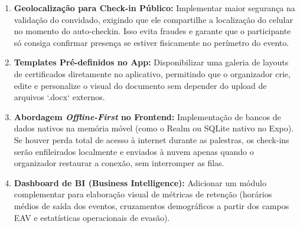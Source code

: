 \begin{enumerate}
    \item \textbf{Geolocalização para Check-in Público:} Implementar maior segurança na validação do convidado, exigindo que ele compartilhe a localização do celular no momento do auto-checkin. Isso evita fraudes e garante que o participante só consiga confirmar presença se estiver fisicamente no perímetro do evento.
    \item \textbf{Templates Pré-definidos no App:} Disponibilizar uma galeria de layouts de certificados diretamente no aplicativo, permitindo que o organizador crie, edite e personalize o visual do documento sem depender do upload de arquivos `.docx` externos.
    \item \textbf{Abordagem \textit{Offline-First} no Frontend:} Implementação de bancos de dados nativos na memória móvel (como o Realm ou SQLite nativo no Expo). Se houver perda total de acesso à internet durante as palestras, os check-ins serão enfileirados localmente e enviados à nuvem apenas quando o organizador restaurar a conexão, sem interromper as filas.
    \item \textbf{Dashboard de BI (Business Intelligence):} Adicionar um módulo complementar para elaboração visual de métricas de retenção (horários médios de saída dos eventos, cruzamentos demográficos a partir dos campos EAV e estatísticas operacionais de evasão).
\end{enumerate}
